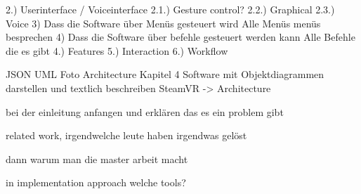 2.) Userinterface / Voiceinterface
    2.1.) Gesture control?
    2.2.) Graphical
    2.3.) Voice
        3) Dass die Software über Menüs gesteuert wird
        Alle Menüs menüs besprechen
        4) Dass die Software über befehle gesteuert werden kann
        Alle Befehle die es gibt
4.) Features
5.) Interaction 
6.) Workflow


JSON UML Foto
Architecture Kapitel 4
Software mit Objektdiagrammen darstellen und textlich beschreiben
 SteamVR -> Architecture

 bei der einleitung anfangen und erklären das es ein problem gibt

 related work, irgendwelche leute haben irgendwas gelöst

 dann warum man die master arbeit macht

 in implementation
    approach
        welche tools?



